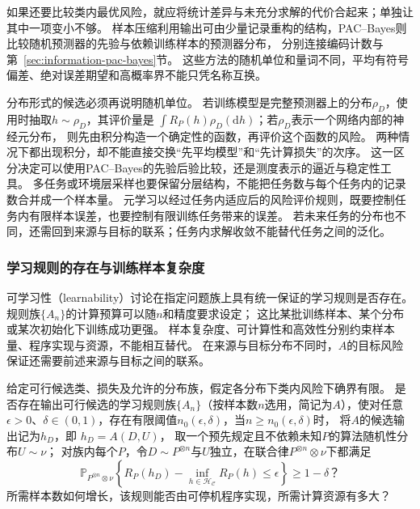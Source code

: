 如果还要比较类内最优风险，就应将统计差异与未充分求解的代价合起来；单独让其中一项变小不够。
样本压缩利用输出可由少量记录重构的结构，PAC--Bayes则比较随机预测器的先验与依赖训练样本的预测器分布，
分别连接编码计数与第~\ref{sec:information-pac-bayes}节。
这些方法的随机单位和量词不同，平均有符号偏差、绝对误差期望和高概率界不能只凭名称互换。

分布形式的候选必须再说明随机单位。
若训练模型是完整预测器上的分布$\rho_D$，使用时抽取$h\sim\rho_D$，其评价量是
$\int R_P(h)\rho_D(\mathrm dh)$；若$\rho_D$表示一个网络内部的神经元分布，
则先由积分构造一个确定性的函数，再评价这个函数的风险。
两种情况下都出现积分，却不能直接交换“先平均模型”和“先计算损失”的次序。
这一区分决定可以使用PAC--Bayes的先验后验比较，还是测度表示的逼近与稳定性工具。
多任务或环境层采样也要保留分层结构，不能把任务数与每个任务内的记录数合并成一个样本量。
元学习以经过任务内适应后的风险评价规则，既要控制任务内有限样本误差，也要控制有限训练任务带来的误差。
若未来任务的分布也不同，还需回到来源与目标的联系；任务内求解收敛不能替代任务之间的泛化。

\subsubsection{学习规则的存在与训练样本复杂度}
\label{sec:future-analysis-learnability}

可学习性（learnability）讨论在指定问题族上具有统一保证的学习规则是否存在。
规则族$\{A_n\}$的计算预算可以随$n$和精度要求设定；
这比某批训练样本、某个分布或某次初始化下训练成功更强。
样本复杂度、可计算性和高效性分别约束样本量、程序实现与资源，不能相互替代。
在来源与目标分布不同时，$A$的目标风险保证还需要前述来源与目标之间的联系。

\begin{mathproblem}[具有统一保证的学习规则是否存在]
  \label{question:future-learnability}
  给定可行候选类、损失及允许的分布族，假定各分布下类内风险下确界有限。
  是否存在输出可行候选的学习规则族$\{A_n\}$（按样本数$n$选用，简记为$A$），使对任意
  $\epsilon>0$、$\delta\in(0,1)$，存在有限阈值$n_0(\epsilon,\delta)$，当$n\geq n_0(\epsilon,\delta)$时，
  将$A$的候选输出记为$h_D$，即
  $h_D=A(D,U)$，
  取一个预先规定且不依赖未知$P$的算法随机性分布$U\sim\nu$；
  对族内每个$P$，令$D\sim P^{\otimes n}$与$U$独立，在联合律$P^{\otimes n}\otimes\nu$下都满足
  \[
    \mathbb P_{P^{\otimes n}\otimes\nu}\!\left\{
      R_P(h_D)-\inf_{h\in\mathcal H_{\mathcal C}}R_P(h)
      \leq\epsilon
    \right\}\geq1-\delta\text{？}
  \]
  所需样本数如何增长，该规则能否由可停机程序实现，所需计算资源有多大？
\end{mathproblem}

